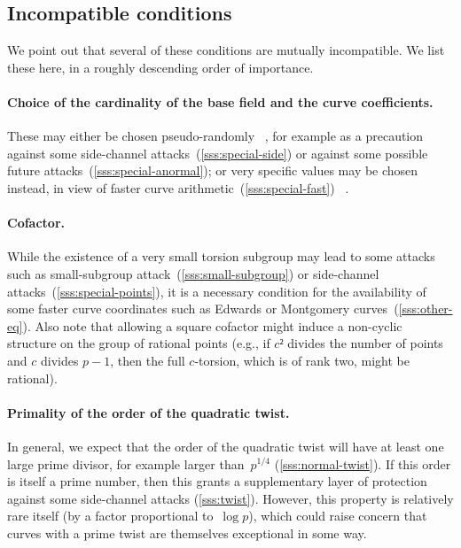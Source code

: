 \documentclass[twocolumn,letterpaper,10pt]{article}
\begin{document}
\bigbreak

\subsection*{Incompatible conditions}
We point out that several of these conditions are mutually incompatible.
We list these here, in a roughly descending order of importance.

\paragraph{Choice of the cardinality of the base field
and the curve coefficients.}
These may either be chosen pseudo-randomly~%
\cite{rfc5639,jorf2011ce}, for example
as a precaution against some side-channel attacks~(\ref{sss:special-side})
or against some possible future attacks~(\ref{sss:special-anormal});
or very specific values may be chosen instead,
in view of faster curve arithmetic~(\ref{sss:special-fast})~%
\cite{nist2000fips186-2,pkc2006bernstein,oscca2010sm2}.

\paragraph{Cofactor.}
While the existence of a very small torsion subgroup
may lead to some attacks such as
small-subgroup attack~(\ref{sss:small-subgroup})
or side-channel attacks~(\ref{sss:special-points}),
it is a necessary condition for the availability
of some faster curve coordinates
such as Edwards or Montgomery curves~(\ref{sss:other-eq}).
Also note that allowing a square cofactor might induce
a non-cyclic structure on the group of rational points
(e.g., if $c²$ divides the number of points and $c$ divides
$p-1$, then the full $c$-torsion, which is of rank two,
might be rational).

\paragraph{Primality of the order of the quadratic twist.}
In general, we expect that the order of the quadratic twist
will have at least one large prime divisor,
for example larger than~$p^{1/4}$ (\ref{sss:normal-twist}).
If this order is itself a prime number,
then this grants a supplementary layer of protection
against some side-channel attacks (\ref{sss:twist}).
However, this property is relatively rare itself
(by a factor proportional to~$\log p$),
which could raise concern that
curves with a prime twist are themselves exceptional in some way.
\end{document}
